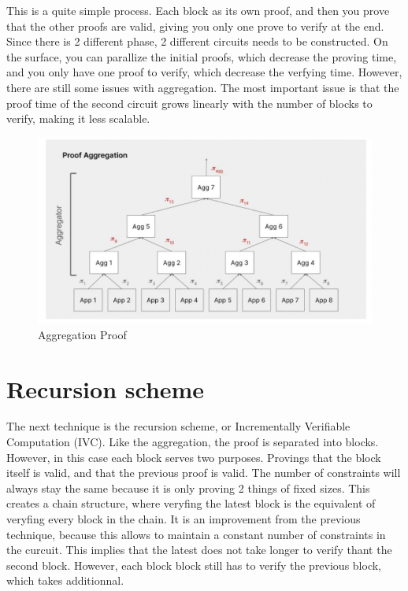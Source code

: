 This is a quite simple process. Each block as its own proof, and then you prove that the other proofs are valid, giving you only one prove 
to verify at the end. Since there is 2 different phase, 2 different circuits needs to be constructed.
On the surface, you can parallize the initial proofs, which decrease the proving time, and you only have one proof to verify, which decrease the verfying time.
However, there are still some issues with aggregation. The most important issue is that the proof time of the second circuit grows linearly with the number of blocks to verify, making it less scalable. \cite{Nova23}
 \begin{figure}[H]
    \centering
    \includegraphics[width=130mm]{AggregationProof.png}
    \caption{Aggregation Proof \cite{TP24}}
    \label{overflow}
    \end{figure}

 \section{Recursion scheme} 
The next technique is the recursion scheme, or Incrementally Verifiable Computation (IVC). Like the aggregation, the proof is separated into blocks.
 However, in this case each block serves two purposes. Provings that the block itself is valid, and that the previous proof is valid. 
 The number of constraints will always stay the same because it is only proving 2 things of fixed sizes. This creates 
 a chain structure, where veryfing the latest block is the equivalent of veryfing every block in the chain.
 It is an improvement from the previous technique, because this allows to maintain a constant number of constraints in the curcuit.
 This implies that the latest does not take longer to verify thant the second block.
 However, each block block still has to verify the previous block, which takes additionnal. \cite{Nova23} 

